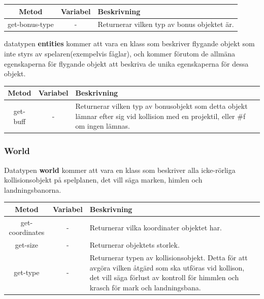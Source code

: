 \documentclass[12pt,a4paper]{article}
\newcounter{subsubsubsection}[subsubsection]
\begin{document}
\begin{tabular}{| c | c | p{8.2cm} |}
	\hline
	\textbf{Metod} & \textbf{Variabel} & \textbf{Beskrivning} \\
	\hline

	get-bonus-type & - & Returnerar vilken typ av bonus objektet är. \\
	\hline
	
\end{tabular}

datatypen \textbf{entities} kommer att vara en klass som beskriver flygande objekt som inte styrs av spelaren(exempelvis fåglar), och kommer förutom de allmäna egenskaperna för flygande objekt att beskriva de unika egenskaperna för dessa objekt. \\

\begin{tabular}{| c | c | p{9.5cm} |}
	\hline
	\textbf{Metod} & \textbf{Variabel} & \textbf{Beskrivning} \\
	\hline
	
	get-buff & - & Returnerar vilken typ av bonusobjekt som detta objekt lämnar efter sig vid kollision med en projektil, eller \#f om ingen lämnas.\\
	\hline
	
\end{tabular}

\subsubsection{World}
Datatypen \textbf{world} kommer att vara en klass som beskriver alla icke-rörliga kollisionsobjekt på spelplanen, det vill säga marken, himlen och landningsbanorna. \\

\begin{tabular}{| c | c | p{8cm} |}
	\hline
	\textbf{Metod} & \textbf{Variabel} & \textbf{Beskrivning} \\
	\hline
	
	get-coordinates & - & Returnerar vilka koordinater objektet har. \\
	\hline
	get-size & - & Returnerar objektets storlek. \\
	\hline
	get-type & - & Returnerar typen av kollisionsobjekt. Detta för att avgöra vilken åtgärd som ska utföras vid kollison, det vill säga förlust av kontroll för himmlen och krasch för mark och landningsbana. \\
	\hline
\end{tabular}
\end{document}
